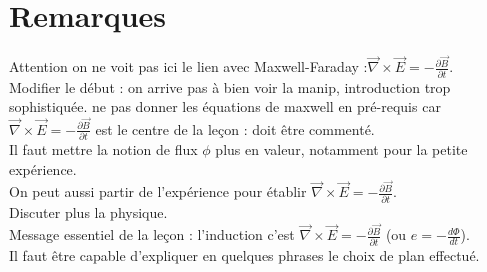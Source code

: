 \documentclass[12pt,prb,aps,epsf]{article}
\begin{document}
\section*{Remarques}
Attention on ne voit pas ici le lien avec Maxwell-Faraday :$\vec{\nabla}\times\vec{E} = - \frac{\partial\vec{B}}{\partial t}$.\\
Modifier le début : on arrive pas à bien voir la manip, introduction trop sophistiquée. ne pas donner les équations de maxwell en pré-requis car $\vec{\nabla}\times\vec{E} = - \frac{\partial\vec{B}}{\partial t}$ est le centre de la leçon : doit être commenté.\\
Il faut mettre la notion de flux $\phi$ plus en valeur, notamment pour la petite expérience.\\
On peut aussi partir de l'expérience pour établir $\vec{\nabla}\times\vec{E} = - \frac{\partial\vec{B}}{\partial t}$.\\
Discuter plus la physique.\\

Message essentiel de la leçon : l'induction c'est $\vec{\nabla}\times\vec{E} = - \frac{\partial\vec{B}}{\partial t}$ (ou $e=-\frac{d\Phi}{dt}$).\\

Il faut être capable d'expliquer en quelques phrases le choix de plan effectué.
\end{document}
